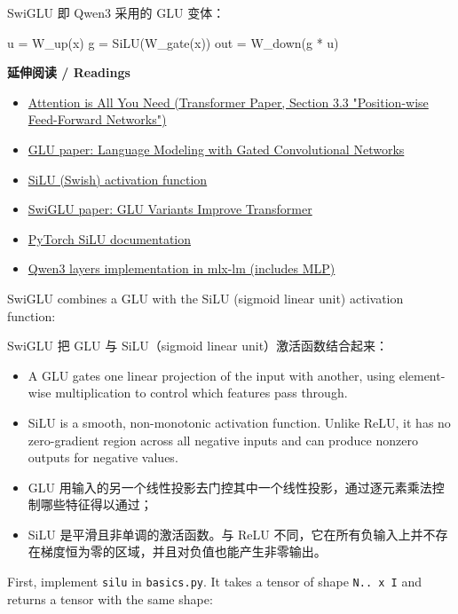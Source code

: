 \documentclass[11pt,a4paper]{article}
\newenvironment{zhpar}{%
  \par\smallskip\begingroup\color{zhcolor}\small\ignorespaces%
}{\endgroup\par\smallskip}
\begin{document}
\begin{zhpar}
SwiGLU 即 Qwen3 采用的 GLU 变体：
\end{zhpar}
\begin{codeblock}
u = W_up(x)
g = SiLU(W_gate(x))
out = W_down(g * u)
\end{codeblock}

\textbf{ 延伸阅读 / Readings}

\begin{itemize}[leftmargin=1.6em,itemsep=0.15em,parsep=0pt]
\item \href{https://arxiv.org/abs/1706.03762}{Attention is All You Need (Transformer Paper, Section 3.3 "Position-wise Feed-Forward Networks")}
\item \href{https://arxiv.org/pdf/1612.08083}{GLU paper: Language Modeling with Gated Convolutional Networks}
\item \href{https://arxiv.org/pdf/1710.05941}{SiLU (Swish) activation function}
\item \href{https://arxiv.org/abs/2002.05202v1}{SwiGLU paper: GLU Variants Improve Transformer}
\item \href{https://pytorch.org/docs/stable/generated/torch.nn.SiLU.html}{PyTorch SiLU documentation}
\item \href{https://github.com/ml-explore/mlx-lm/blob/main/mlx_lm/models/qwen3.py}{Qwen3 layers implementation in mlx-lm (includes MLP)}
\end{itemize}

SwiGLU combines a GLU with the SiLU (sigmoid linear unit) activation function:

\begin{zhpar}
SwiGLU 把 GLU 与 SiLU（sigmoid linear unit）激活函数结合起来：
\end{zhpar}
\begin{itemize}[leftmargin=1.6em,itemsep=0.15em,parsep=0pt]
\item A GLU gates one linear projection of the input with another, using element-wise multiplication to control which features pass through.
\item SiLU is a smooth, non-monotonic activation function. Unlike ReLU, it has no zero-gradient region across all negative inputs and can produce nonzero outputs for negative values.
\end{itemize}

\begin{zhpar}
\begin{itemize}[leftmargin=1.6em,itemsep=0.15em,parsep=0pt]
\item GLU 用输入的另一个线性投影去门控其中一个线性投影，通过逐元素乘法控制哪些特征得以通过；
\item SiLU 是平滑且非单调的激活函数。与 ReLU 不同，它在所有负输入上并不存在梯度恒为零的区域，并且对负值也能产生非零输出。
\end{itemize}
\end{zhpar}
First, implement \texttt{silu} in \texttt{basics.py}. It takes a tensor of shape \texttt{N.. x I} and returns a tensor with the same shape:
\end{document}
